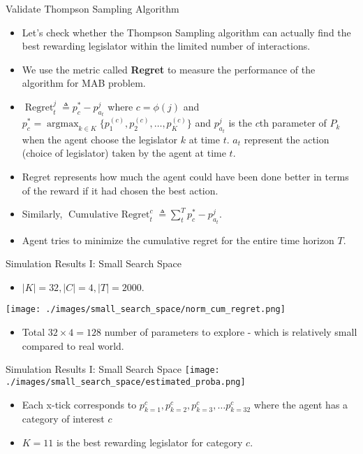\documentclass{beamer}
\begin{document}
	\begin{frame}{Validate Thompson Sampling Algorithm}
		\begin{itemize}
			\item Let's check whether the Thompson Sampling algorithm can actually find the best rewarding legislator within the limited number of interactions.
			\item We use the metric called \textbf{Regret} to measure the performance of the algorithm for MAB problem. 
			\item $\operatorname{Regret}_t^j \triangleq p_c^*-p_{a_t}^j$ where $c = \phi(j)$ and $p_c^* = \operatorname{argmax}_{k \in K}\{p_1^{(c)}, p_2^{(c)}, \hdots, p_K^{(c)}\} $ and $p_{a_t}^j$ is the $c$th parameter of $P_k$ when the agent choose the legislator $k$ at time $t$. $a_t$ represent the action (choice of legislator) taken by the agent at time $t$.
			\item Regret represents how much the agent could have been done better in terms of the reward if it had chosen the best action.
			\item Similarly, $\operatorname{Cumulative \text{ } Regret}_t^c \triangleq \sum_t^T p_c^*-p_{a_t}^j$.
			\item Agent tries to minimize the cumulative regret for the entire time horizon $T$.
		\end{itemize}
	\end{frame}
	
	\begin{frame}{Simulation Results I: Small Search Space}
		\begin{itemize}
			\item  $|K|=32, |C|=4, |T|=2000$.
		\end{itemize}
		\centering	\texttt{[image: ./images/small\_search\_space/norm\_cum\_regret.png]}
		\begin{itemize}
			\item  Total $32 \times 4 = 128$ number of parameters to explore - which is relatively small compared to real world.
		\end{itemize}
	\end{frame}

	\begin{frame}{Simulation Results I: Small Search Space}
		\centering \texttt{[image: ./images/small\_search\_space/estimated\_proba.png]}
		\begin{itemize}
			\item Each x-tick corresponds to $p_{k=1}^c, p_{k=2}^c, p_{k=3}^c, \hdots p_{k=32}^c$ where the agent has a category of interest $c$
			\item $K=11$ is the best rewarding legislator for category $c$.
		\end{itemize}
	\end{frame}
\end{document}
